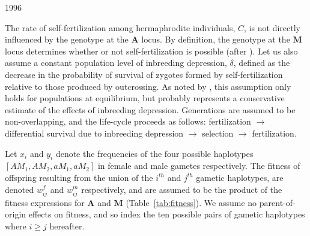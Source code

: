 1996\documentclass[9pt,twocolumn,twoside,lineno]{gsajnl}
\begin{document}
The rate of self-fertilization among hermaphrodite individuals, $C$, is not directly influenced by the genotype at the $\mathbf{A}$ locus. By definition, the genotype at the $\mathbf{M}$ locus determines whether or not self-fertilization is possible (after \citealt{Charlesworth1978a}). Let us also assume a constant population level of inbreeding depression, $\delta$, defined as the decrease in the probability of survival of zygotes formed by self-fertilization relative to those produced by outcrossing. As noted by \citet{Charlesworth1978a}, this assumption only holds for populations at equilibrium, but probably represents a conservative estimate of the effects of inbreeding depression. Generations are assumed to be non-overlapping, and the life-cycle proceeds as follows: fertilization $\rightarrow$ differential survival due to inbreeding depression $\rightarrow$ selection $\rightarrow$ fertilization.

Let $x_i$ and $y_i$ denote the frequencies of the four possible haplotypes $[AM_1,AM_2,aM_1,aM_2]$ in female and male gametes respectively. The fitness of offspring resulting from the union of the $i^{th}$ and $j^{th}$ gametic haplotypes, are denoted $w^f_{ij}$ and $w^m_{ij}$ respectively, and are assumed to be the product of the fitness expressions for $\mathbf{A}$ and $\mathbf{M}$ (Table~\ref{tab:fitness}). We assume no parent-of-origin effects on fitness, and so index the ten possible pairs of gametic haplotypes where $i \geq j$ hereafter.
\end{document}
